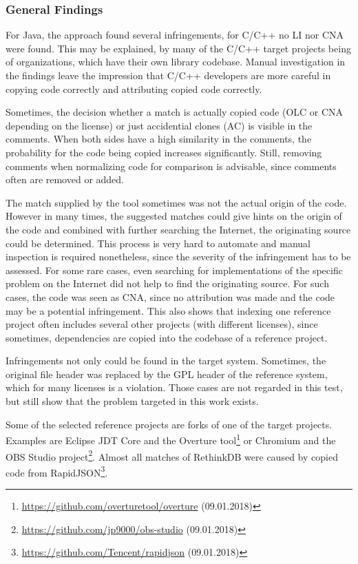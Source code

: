 \subsubsection*{General Findings}
For Java, the approach found several infringements, for C/C++ no LI nor CNA were found.
This may be explained, by many of the C/C++ target projects being of organizations, which have their own library codebase.
Manual investigation in the findings leave the impression that C/C++ developers are more careful in copying code correctly and attributing copied code correctly.

Sometimes, the decision whether a match is actually copied code (OLC or CNA depending on the license) or just accidential clones (AC) is visible in the comments.
When both sides have a high similarity in the comments, the probability for the code being copied increases significantly.
Still, removing comments when normalizing code for comparison is advisable, since comments often are removed or added.

The match supplied by the tool sometimes was not the actual origin of the code.
However in many times, the suggested matches could give hints on the origin of the code and combined with further searching the Internet, the originating source could be determined.
This process is very hard to automate and manual inspection is required nonetheless, since the severity of the infringement has to be assessed.
For some rare cases, even searching for implementations of the specific problem on the Internet did not help to find the originating source.
For such cases, the code was seen as CNA, since no attribution was made and the code may be a potential infringement.
This also shows that indexing one reference project often includes several other projects (with different licenses), since sometimes, dependencies are copied into the codebase of a reference project.

Infringements not only could be found in the target system.
Sometimes, the original file header was replaced by the GPL header of the reference system, which for many licenses is a violation.
Those cases are not regarded in this test, but still show that the problem targeted in this work exists.

Some of the selected reference projects are forks of one of the target projects.
Examples are Eclipse JDT Core and the Overture tool\footnote{\href{https://github.com/overturetool/overture}{https://github.com/overturetool/overture} (09.01.2018)} or Chromium and the OBS Studio project\footnote{\href{https://github.com/jp9000/obs-studio}{https://github.com/jp9000/obs-studio} (09.01.2018)}.
Almost all matches of RethinkDB were caused by copied code from RapidJSON\footnote{\href{https://github.com/Tencent/rapidjson}{https://github.com/Tencent/rapidjson} (09.01.2018)}.

